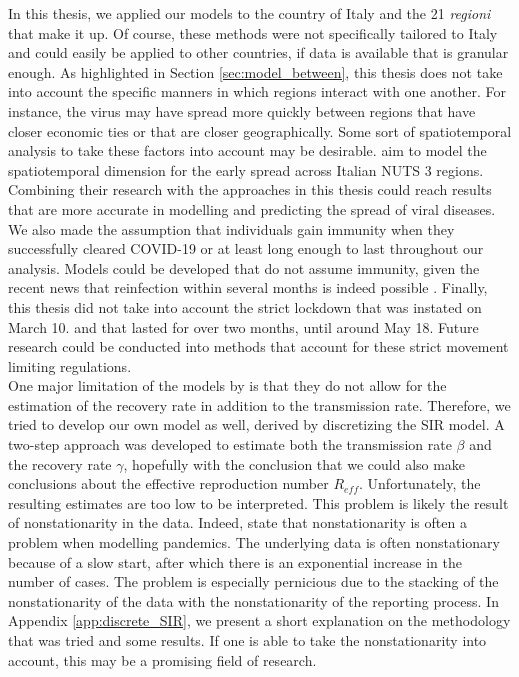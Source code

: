 \documentclass[12pt]{article}
\begin{document}
	In this thesis, we applied our models to the country of Italy and the 21 \textit{regioni} that make it up. Of course, these methods were not specifically tailored to Italy and could easily be applied to other countries, if data is available that is granular enough. As highlighted in Section \ref{sec:model_between}, this thesis does not take into account the specific manners in which regions interact with one another. For instance, the virus may have spread more quickly between regions that have closer economic ties or that are closer geographically. Some sort of spatiotemporal analysis to take these factors into account may be desirable. \textcite{giuliani2020modelling} aim to model the spatiotemporal dimension for the early spread across Italian NUTS 3 regions. Combining their research with the approaches in this thesis could reach results that are more accurate in modelling and predicting the spread of viral diseases. \\
	
	We also made the assumption that individuals gain immunity when they successfully cleared COVID-19 or at least long enough to last throughout our analysis. Models could be developed that do not assume immunity, given the recent news that reinfection within several months is indeed possible \parencite{bloomberg2020reinfection}. Finally, this thesis did not take into account the strict lockdown that was instated on March 10. and that lasted for over two months, until around May 18. Future research could be conducted into methods that account for these strict movement limiting regulations. \\
	
	One major limitation of the models by \textcite{adda2016economic} is that they do not allow for the estimation of the recovery rate in addition to the transmission rate. Therefore, we tried to develop our own model as well, derived by discretizing the SIR model. A two-step approach was developed to estimate both the transmission rate $\beta$ and the recovery rate $\gamma$, hopefully with the conclusion that we could also make conclusions about the effective reproduction number $R_{eff}$. Unfortunately, the resulting estimates are too low to be interpreted. This problem is likely the result of nonstationarity in the data. Indeed, \textcite{castle2020nonstationarity} state that nonstationarity is often a problem when modelling pandemics. The underlying data is often nonstationary because of a slow start, after which there is an exponential increase in the number of cases. The problem is especially pernicious due to the stacking of the nonstationarity of the data with the nonstationarity of the reporting process. In Appendix \ref{app:discrete_SIR}, we present a short explanation on the methodology that was tried and some results. If one is able to take the nonstationarity into account, this may be a promising field of research. \\
	
\end{document}
